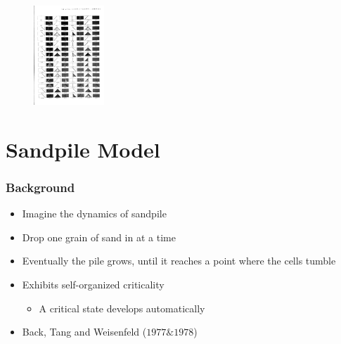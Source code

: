 \documentclass{beamer}
\begin{document}
{\begin{figure}
\includegraphics[width = 100]{lots}
\end{figure}

}

\section{Sandpile Model}
\frame
{
  \frametitle{Background}

  \begin{itemize}
  \item<1-> Imagine the dynamics of sandpile
  \item<2-> Drop one grain of sand in at a time
  \item<3-> Eventually the pile grows, until it reaches a point where the cells tumble
  \item<4-> Exhibits self-organized criticality
  	\begin{itemize}
	\item A critical state develops automatically
	\end{itemize}
  \item<5-> Back, Tang and Weisenfeld ($1977 \& 1978$)
  \end{itemize}
}
\end{document}
